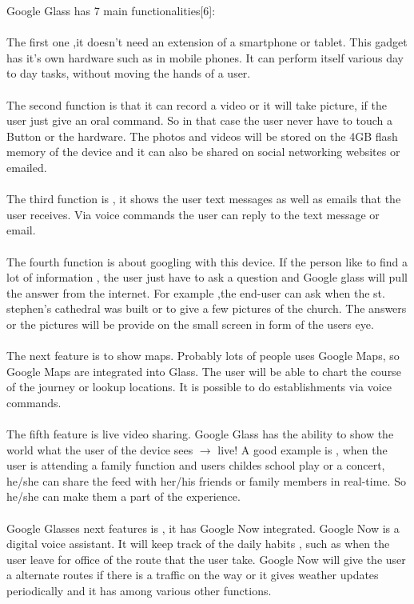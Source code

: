 Google Glass has 7 main functionalities[6]:
\\
\\
The first one ,it doesn't need an extension of a smartphone or tablet. This gadget has it's own hardware such as in mobile phones. It can perform itself various day to day tasks, without moving the hands of a user. 
\\
\\
The second function is that it can record a video or it will take picture, if the user just give an oral command. So in that case the user never have to touch a Button or the hardware. The photos and videos will be stored on the 4GB flash memory of the device and it can also be shared on social networking websites or emailed.
\\
\\
The third function is , it shows the user text messages as well as emails that the user receives. Via voice commands the user can reply to the text message or email.
\\
\\
The fourth function is about googling with this device. If the person like to find a lot of information , the user just have to ask a question and Google glass will pull the answer from the internet. For example ,the end-user can ask when the st. stephen's cathedral was built or to give a few pictures of the church. The answers or the pictures will be provide on the small screen in form of the users eye.
\\
\\
The next feature is to show maps. Probably lots of people uses Google Maps, so Google Maps are integrated into Glass. The user will be able to chart the course of the journey or lookup locations. It is possible to do establishments via voice commands.
\\
\\
The fifth feature is live video sharing. Google Glass has the ability to show the world what the user of the device sees $\rightarrow$ live! A good example is , when the user is attending a family function and users childes school play or a concert, he/she can share the feed with her/his friends or family members in real-time. So he/she can make them a part of the experience.
\\
\\
Google Glasses next features is , it has Google Now integrated. Google Now is a digital voice assistant. It will keep track of the daily habits , such as when the user leave for office of the route that the user take.  Google Now  will give the user a alternate routes if there is a traffic on the way or it gives weather updates periodically and it has among various other functions.
